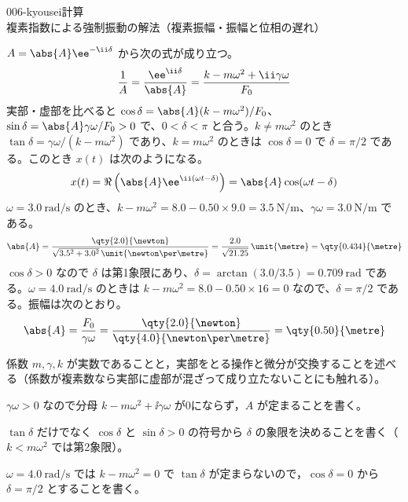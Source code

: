 \documentclass[uplatex,dvipdfmx,a4paper,11pt]{jsarticle}
\begin{document}
\begin{mondai}{006-kyousei}{計算}{複素指数による強制振動の解法（複素振幅・振幅と位相の遅れ）}
\begin{tadashii}
$A=\abs{A}\ee^{-\ii\delta}$ から次の式が成り立つ。
\[ \frac{1}{A}=\frac{\ee^{\ii\delta}}{\abs{A}}=\frac{k-m\omega^{2}+\ii\gamma\omega}{F_{0}} \]
実部・虚部を比べると $\cos\delta=\abs{A}(k-m\omega^{2})/F_{0}$、$\sin\delta=\abs{A}\gamma\omega/F_{0}>0$ で、$0<\delta<\pi$ と合う。$k\neq m\omega^{2}$ のとき $\tan\delta=\gamma\omega/(k-m\omega^{2})$ であり、$k=m\omega^{2}$ のときは $\cos\delta=0$ で $\delta=\pi/2$ である。このとき $x(t)$ は次のようになる。
\[ x(t)=\Re\left(\abs{A}\ee^{\ii(\omega t-\delta)}\right)=\abs{A}\cos(\omega t-\delta) \]
 $\omega=\qty{3.0}{\radian\per\second}$ のとき、$k-m\omega^{2}=8.0-0.50\times9.0=\qty{3.5}{\newton\per\metre}$、$\gamma\omega=\qty{3.0}{\newton\per\metre}$ である。
\[ \abs{A}=\frac{\qty{2.0}{\newton}}{\sqrt{3.5^{2}+3.0^{2}}\,\unit{\newton\per\metre}}=\frac{2.0}{\sqrt{21.25}}\,\unit{\metre}=\qty{0.434}{\metre} \]
$\cos\delta>0$ なので $\delta$ は第1象限にあり、$\delta=\arctan(3.0/3.5)=\qty{0.709}{\radian}$ である。$\omega=\qty{4.0}{\radian\per\second}$ のときは $k-m\omega^{2}=8.0-0.50\times16=0$ なので、$\delta=\pi/2$ である。振幅は次のとおり。
\[ \abs{A}=\frac{F_{0}}{\gamma\omega}=\frac{\qty{2.0}{\newton}}{\qty{4.0}{\newton\per\metre}}=\qty{0.50}{\metre} \]
\begin{ronten}
  \item {} 係数 $m,\gamma,k$ が実数であることと，実部をとる操作と微分が交換することを述べる（係数が複素数なら実部に虚部が混ざって成り立たないことにも触れる）。
  \item {} $\gamma\omega>0$ なので分母 $k-m\omega^{2}+\ii\gamma\omega$ が0にならず，$A$ が定まることを書く。
  \item {} $\tan\delta$ だけでなく $\cos\delta$ と $\sin\delta>0$ の符号から $\delta$ の象限を決めることを書く（$k<m\omega^{2}$ では第2象限）。
  \item {} $\omega=\qty{4.0}{\radian\per\second}$ では $k-m\omega^{2}=0$ で $\tan\delta$ が定まらないので，$\cos\delta=0$ から $\delta=\pi/2$ とすることを書く。

\end{ronten}
\end{tadashii}
\end{mondai}
\end{document}
